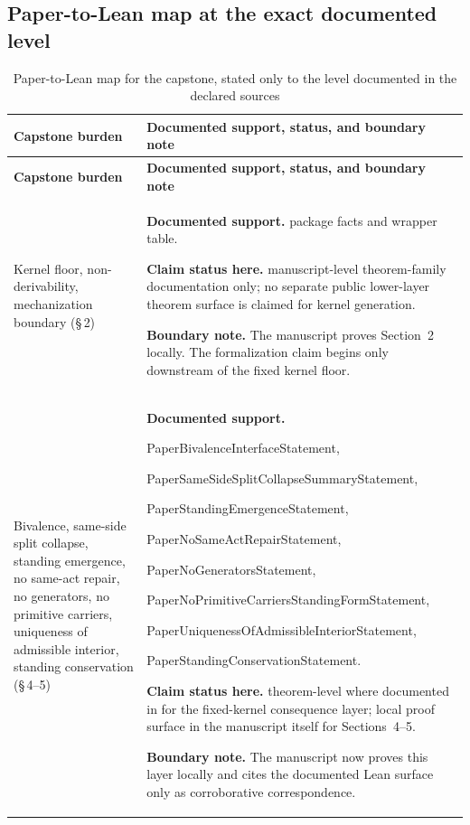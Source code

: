\subsection*{Paper-to-Lean map at the exact documented level}

{\small
\renewcommand{\arraystretch}{1.14}
\begin{longtable}{P{0.24\textwidth}P{0.70\textwidth}}
\caption{Paper-to-Lean map for the capstone, stated only to the level documented in the declared sources}\\
\toprule
\textbf{Capstone burden} & \textbf{Documented support, status, and boundary note} \\
\midrule
\endfirsthead
\toprule
\textbf{Capstone burden} & \textbf{Documented support, status, and boundary note} \\
\midrule
\endhead
\bottomrule
\endfoot
Kernel floor, non-derivability, mechanization boundary (\S\,2) &
\textbf{Documented support.} \fcas{} package facts and wrapper table.\par
\textbf{Claim status here.} manuscript-level theorem-family documentation only; no separate public lower-layer theorem surface is claimed for kernel generation.\par
\textbf{Boundary note.} The manuscript proves Section~2 locally. The formalization claim begins only downstream of the fixed kernel floor. \\

Bivalence, same-side split collapse, standing emergence, no same-act repair, no generators, no primitive carriers, uniqueness of admissible interior, standing conservation (\S\,4--5) &
\textbf{Documented support.} {\ttfamily\footnotesize
PaperBivalenceInterfaceStatement,\par
PaperSameSideSplitCollapseSummaryStatement,\par
PaperStandingEmergenceStatement,\par
PaperNoSameActRepairStatement,\par
PaperNoGeneratorsStatement,\par
PaperNoPrimitiveCarriersStandingFormStatement,\par
PaperUniquenessOfAdmissibleInteriorStatement,\par
PaperStandingConservationStatement.}\par
\textbf{Claim status here.} theorem-level where documented in \fcas{} for the fixed-kernel consequence layer; local proof surface in the manuscript itself for Sections~4--5.\par
\textbf{Boundary note.} The manuscript now proves this layer locally and cites the documented Lean surface only as corroborative correspondence. \\


\end{longtable}}

